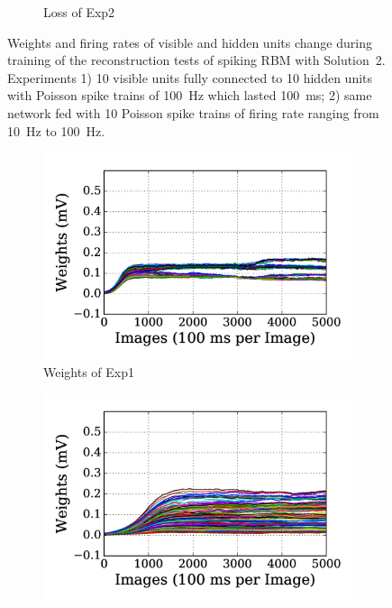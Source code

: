 \begin{figure}
\begin{subfigure}[t]{0.48\textwidth}
		\caption{Loss of Exp2}
	\end{subfigure}
	\caption[SRBM-S2 training of the reconstruction tests.]{Weights and firing rates of visible and hidden units change during training of the reconstruction tests of spiking RBM with Solution~2. 
		Experiments 1) 10 visible units fully connected to 10 hidden units with Poisson spike trains of 100~Hz which lasted 100~ms; 2) same network fed with 10 Poisson spike trains of firing rate ranging from 10~Hz to 100~Hz.}
	\label{fig:sol2_rbm}
\end{figure}

\begin{figure}
	\centering
	\begin{subfigure}[t]{0.48\textwidth}
		\includegraphics[width=\textwidth]{pics_sdlm/05_exp_SAE_teach_long/exp1_weights_s.png}
		\caption{Weights of Exp1}
	\end{subfigure}
	\begin{subfigure}[t]{0.48\textwidth}
		\includegraphics[width=\textwidth]{pics_sdlm/05_exp_SAE_teach_long/exp2_weights_s.png}

\end{subfigure}
\end{figure}

